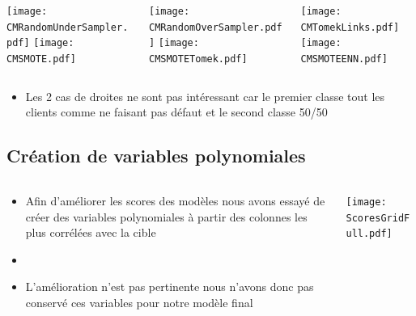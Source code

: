 \documentclass[8pt,aspectratio=169,hyperref={unicode=true}]{beamer}
\begin{document}
\begin{frame}{\insertsection}{\insertsubsection}
    \vspace{2pt}
    \begin{columns}
        \begin{column}{.3\textwidth}
            \texttt{[image: CMRandomUnderSampler.pdf]}
            \texttt{[image: CMSMOTE.pdf]}
        \end{column}
        \begin{column}{.3\textwidth}
            \texttt{[image: CMRandomOverSampler.pdf]}
            \texttt{[image: CMSMOTETomek.pdf]}
        \end{column}
        \begin{column}{.3\textwidth}
            \texttt{[image: CMTomekLinks.pdf]}
            \texttt{[image: CMSMOTEENN.pdf]}
        \end{column}
    \end{columns}
    \small
    \begin{itemize}
        \item Les 2 cas de droites ne sont pas intéressant car le premier classe tout les clients comme ne faisant pas défaut et le second classe 50/50
    \end{itemize}
\end{frame}

\subsection{Création de variables polynomiales}
\begin{frame}{\insertsection}{\insertsubsection}
    \vspace{2pt}
    \begin{columns}
        \begin{column}{.5\textwidth}
            \begin{itemize}
                \item Afin d'améliorer les scores des modèles nous avons essayé de créer des variables polynomiales à partir des colonnes les plus corrélées avec la cible
                \item[]
                \item L'amélioration n'est pas pertinente nous n'avons donc pas conservé ces variables pour notre modèle final
            \end{itemize}
        \end{column}
        \begin{column}{.5\textwidth}
            \texttt{[image: ScoresGridFull.pdf]}
        \end{column}
    \end{columns}
\end{frame}
\end{document}
